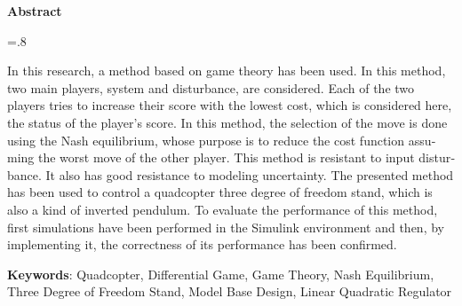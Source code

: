 


\pagestyle{empty}

\begin{latin}
	
	\begin{center}
		\textbf{Abstract}
	\end{center}
	\baselineskip=.8\baselineskip
	
	In this research, a method based on game theory has been used. In this method, two main players, system and disturbance, are considered. Each of the two players tries to increase their score with the lowest cost, which is considered here, the status of the player's score. In this method, the selection of the move is done using the Nash equilibrium, whose purpose is to reduce the cost function assuming the worst move of the other player. This method is resistant to input disturbance. It also has good resistance to modeling uncertainty. The presented method has been used to control a quadcopter three degree of freedom stand, which is also a kind of inverted pendulum. To evaluate the performance of this method, first simulations have been performed in the Simulink environment and then, by implementing it, the correctness of its performance has been confirmed.
	
	\bigskip\noindent\textbf{Keywords}:
	Quadcopter, Differential Game, Game Theory, Nash Equilibrium, Three Degree of Freedom Stand, Model Base Design, Linear Quadratic Regulator
	
\end{latin}

\newpage